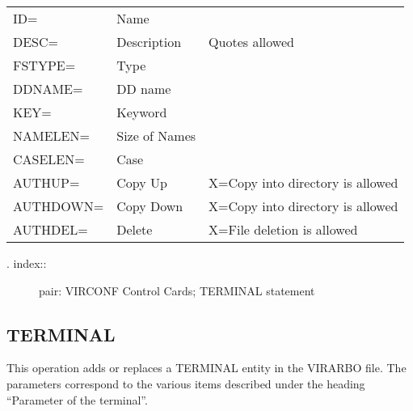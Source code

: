 \documentclass[letterpaper,10pt,english]{sphinxmanual}
\begin{document}
\begin{savenotes}\sphinxattablestart
\centering
\begin{tabulary}{\linewidth}[t]{|T|T|T|}
\hline
{}\relax &\relax &\relax \\
\hline
ID=
&
Name
&\\
\hline
DESC=
&
Description
&
Quotes allowed
\\
\hline
FSTYPE=
&
Type
&\\
\hline
DDNAME=
&
DD name
&\\
\hline
KEY=
&
Keyword
&\\
\hline
NAMELEN=
&
Size of Names
&\\
\hline
CASELEN=
&
Case
&\\
\hline
AUTHUP=
&
Copy Up
&
X=Copy into directory is allowed
\\
\hline
AUTHDOWN=
&
Copy Down
&
X=Copy into directory is allowed
\\
\hline
AUTHDEL=
&
Delete
&
X=File deletion is allowed
\\
\hline
\end{tabulary}
\par
\sphinxattableend\end{savenotes}
\begin{description}
\item[{. index::}] \leavevmode
pair: VIRCONF Control Cards; TERMINAL statement

\end{description}


\subsection{TERMINAL}
\label{\detokenize{Installation_Guide:terminal}}
This operation adds or replaces a TERMINAL entity in the VIRARBO file. The parameters correspond to the various items described under the heading “Parameter of the terminal”.
\end{document}
